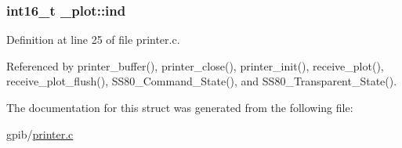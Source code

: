 \hypertarget{struct__plot_ab02a041a2c701b09447d883089abba4f}{
\subsubsection[{ind}]{\setlength{\rightskip}{0pt plus 5cm}int16\-\_\-t \-\_\-plot\-::ind}}\label{struct__plot_ab02a041a2c701b09447d883089abba4f}


Definition at line 25 of file printer.\-c.



Referenced by printer\-\_\-buffer(), printer\-\_\-close(), printer\-\_\-init(), receive\-\_\-plot(), receive\-\_\-plot\-\_\-flush(), S\-S80\-\_\-\-Command\-\_\-\-State(), and S\-S80\-\_\-\-Transparent\-\_\-\-State().



The documentation for this struct was generated from the following file\-:\begin{DoxyCompactItemize}
\item 
gpib/\hyperlink{printer_8c}{printer.\-c}\end{DoxyCompactItemize}
